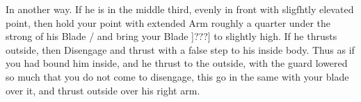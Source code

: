 \newpage


\newpage


\exercise{}


In another way. If he is in the middle third, evenly in front with sligfhtly elevated point, then hold your point with extended Arm roughly a quarter under the strong of his Blade / and bring your Blade ]???] to slightly high. If he thrusts outside, then Disengage and thrust with a false step to his inside body. Thus as if you had bound him inside, and he thrust to the outside, with the guard lowered so much that you do not come to disengage, this go in the same with your blade over it, and thrust outside over his right arm.


